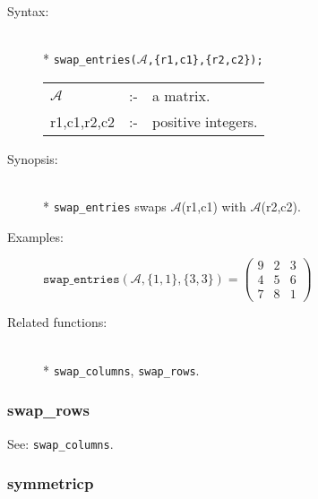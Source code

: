 \begin{description}
\item[Syntax:]\mbox{}\\*
\texttt{swap\_entries($\mathcal{A}$,\{r1,c1\},\{r2,c2\});}\\[2mm]
\begin{tabular}{l l l}
$\mathcal{A}$  &:-& a matrix. \\
r1,c1,r2,c2 &:-& positive integers.
\end{tabular}

\item[Synopsis:]\mbox{}\\*
\texttt{swap\_entries} swaps $\mathcal{A}$(r1,c1) with
                $\mathcal{A}$(r2,c2).

\item[Examples:]
\begin{flushleft}
\(
\texttt{swap\_entries}(\mathcal{A},\{1,1\},\{3,3\}) =
        \begin{pmatrix} 9 & 2 & 3 \\ 4 & 5 & 6 \\ 7 & 8 & 1 \end{pmatrix}
\)
\end{flushleft}

\item[Related functions:]\mbox{}\\*
\texttt{swap\_columns}, \texttt{swap\_rows}.
\end{description}


\subsubsection{swap\_rows}
\label{linalg:swap_rows}
See: \texttt{swap\_columns}.


\subsubsection{symmetricp}
\label{linalg:symmetricp}


